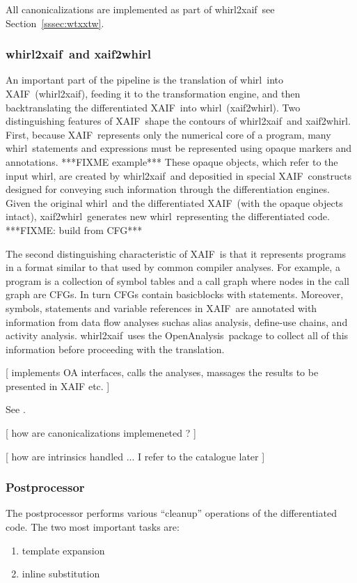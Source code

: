 \documentclass[acmtocl,acmnow]{acmtrans2m}
\newcommand{\basicblock}{basicblock}
\newcommand{\OpenAnalysis}{OpenAnalysis}
\newcommand{\xaif}{XAIF}
\newcommand{\whirl}{whirl}
\newcommand{\whirlToxaif}{whirl2xaif}
\newcommand{\xaifTowhirl}{xaif2whirl}
\newcommand{\refsec}[1]{Section~\ref{#1}}
\begin{document}
All canonicalizations are implemented as part of \whirlToxaif\, see 
\refsec{sssec:wtxxtw}.

\subsubsection*{\whirlToxaif\ and \xaifTowhirl} \label{sssec:wtxxtw}

An important part of the pipeline is the  translation of \whirl\ into \xaif\
(\whirlToxaif), feeding it to the transformation engine, and then
backtranslating the differentiated \xaif\ into \whirl\ (\xaifTowhirl).
Two distinguishing features of \xaif\ shape the contours of \whirlToxaif\ 
and \xaifTowhirl.  
First, because \xaif\ represents only the numerical
core of a program, many \whirl\ statements and expressions must be
represented using opaque markers and annotations.  
{\color{Red} ***FIXME example*** } 
These opaque objects, which refer to the input \whirl, are created by
\whirlToxaif\ and depositied in special \xaif\ constructs designed for
conveying such information through the differentiation engines.  Given
the original \whirl\ and the differentiated \xaif\ (with the opaque
objects intact), \xaifTowhirl\ generates new \whirl\ representing the
differentiated code. {\color {Red} ***FIXME: build from CFG***}

The second distinguishing characteristic of \xaif\ is that it represents
programs in a format 
similar to that used by  common compiler analyses.  
For example, a program is a
collection of symbol tables and a call graph where nodes in the call
graph are CFGs. In turn CFGs contain {\basicblock}s with 
statements.  
Moreover, symbols, statements and variable
references in \xaif\ are annotated with information from data flow
analyses suchas alias analysis, define-use chains, and activity
analysis.  \whirlToxaif\ uses the \OpenAnalysis\  package to
collect all of this information before proceeding with the
translation.

{\color{Red} [ implements OA interfaces, calls the analyses, 
	massages the results to be presented in XAIF etc. ] }

See \cite{RiceTechreport}.

{\color{Red} [ how are canonicalizations implemeneted ?  ] }


{\color{Red} [ how are intrinsics handled ... I refer to the catalogue later  ] }

\subsubsection*{Postprocessor}
The postprocessor performs various ``cleanup'' operations of the
differentiated code. The two most important tasks are:
   \begin{enumerate}
      \item template expansion
      \item inline substitution
   \end{enumerate}
\end{document}

